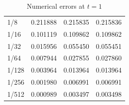 \documentclass{homework}
\begin{document}
\begin{arabicparts}
\begin{table}[htb]
\begin{tabular}{@{}llll@{}}
				1/8 & 0.211888 & 0.215835 & 0.215836 \\
				1/16 & 0.101119 & 0.109862 & 0.109862 \\
				1/32 & 0.015956 & 0.055450 & 0.055451 \\
				1/64 & 0.007944 & 0.027855 & 0.027860 \\
				1/128 & 0.003964 & 0.013964 & 0.013964 \\
				1/256 & 0.001980 & 0.006991 & 0.006991\\
				1/512 & 0.000989 & 0.003497 & 0.003498 \\
				\bottomrule
			\end{tabular}
			\caption{Numerical errors at $t=1$}
			\label{table:p2}
		\end{table}
	\end{arabicparts}
\end{document}
